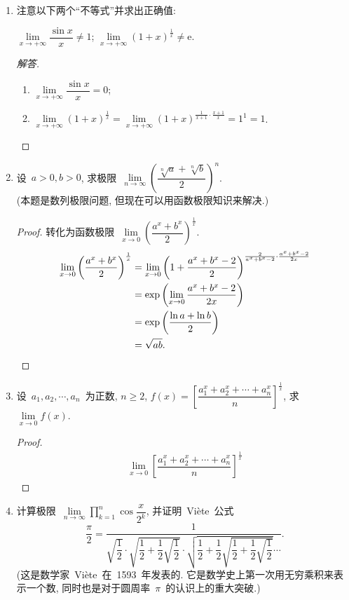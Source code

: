 \documentclass[UTF8,a4paper,11pt,twoside]{book}
\newcommand{\e}{\mathrm e}
\begin{document}
\begin{enumerate}
	\item 注意以下两个``不等式''并求出正确值:
	      \begin{tabenum}[(1)]
		      \tabenumitem $\lim\limits_{x\to+\infty} \dfrac{\sin{x}}{x}\neq 1$;
		      \tabenumitem $\lim\limits_{x\to+\infty} (1+x)^{\frac{1}{x}}\neq \e$.
	      \end{tabenum}
	      \begin{proof}[解答]
		      \begin{enumerate}[(1)]
			      \item $\lim\limits_{x\to+\infty} \dfrac{\sin{x}}{x}=0$;
			      \item $\lim\limits_{x\to+\infty} (1+x)^{\frac{1}{x}}=\lim\limits_{x\to+\infty} (1+x)^{\frac{1}{x+1}\cdot\frac{x+1}{x}}=1^1=1$. \qedhere
		      \end{enumerate}
	      \end{proof}

	\item 设~$a>0, b>0$, 求极限~$\lim\limits_{n\to\infty} \left(\dfrac{\sqrt[n]{a}+\sqrt[n]{b}}{2}\right)^n$. \\
	      (本题是数列极限问题, 但现在可以用函数极限知识来解决.)
	      \begin{proof}
			转化为函数极限~$\lim\limits_{x\to 0} \left(\dfrac{a^x+b^x}{2}\right)^{\frac{1}{x}}$.
			\[
				\begin{split}
					\lim\limits_{x\to 0} \left(\dfrac{a^x+b^x}{2}\right)^{\frac{1}{x}}&=\lim\limits_{x\to 0} \left(1+\dfrac{a^x+b^x-2}{2}\right)^{\frac{2}{a^x+b^x-2}\cdot\frac{a^x+b^x-2}{2x}}\\
					&={\rm exp}\left(\lim\limits_{x\to 0}\dfrac{a^x+b^x-2}{2x}\right)\\
					&={\rm exp}\left(\dfrac{\ln{a}+\ln{b}}{2}\right)\\
					&=\sqrt{ab}. \qedhere
				\end{split}
			\]
	      \end{proof}
	\item 设~$a_1, a_2, \cdots, a_n$~为正数, $n\geqslant 2$, $f(x)=\left[\dfrac{a_1^x+a_2^x+\cdots+a_n^x}{n}\right]^{\frac{1}{x}}$, 求~$\lim\limits_{x\to 0} f(x)$.
		\begin{proof}
			\[
				\begin{split}
					\lim\limits_{x\to 0} \left[\dfrac{a_1^x+a_2^x+\cdots+a_n^x}{n}\right]^{\frac{1}{x}}
				\end{split}
			\]
		\end{proof}
	\item 计算极限~$\lim\limits_{n\to\infty} \displaystyle\prod\limits_{k=1}^n \cos{\dfrac{x}{2^k}}$, 并证明~Vi\`ete~公式
	      \[
		      \dfrac{\pi}{2}=\dfrac{1}{ \sqrt{\dfrac{1}{2}} \cdot \sqrt{\dfrac{1}{2}+\dfrac{1}{2}\sqrt{\dfrac{1}{2}}} \cdot \sqrt{\dfrac{1}{2}+\dfrac{1}{2}\sqrt{\dfrac{1}{2}+\dfrac{1}{2}\sqrt{\dfrac{1}{2}}}}\cdots}.
	      \]
	      (这是数学家~Vi\`ete~在~1593~年发表的. 它是数学史上第一次用无穷乘积来表示一个数, 同时也是对于圆周率~$\pi$~的认识上的重大突破.)
\end{enumerate}
\end{document}
